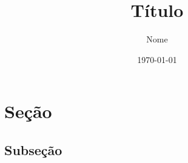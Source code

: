 \documentclass{article}
\title{Título}
\author{Nome}
\date{\today}
\begin{document}
\maketitle

\section{Seção}


\lipsum[1]

\subsection{Subseção}

\lipsum[2]
\end{document}
